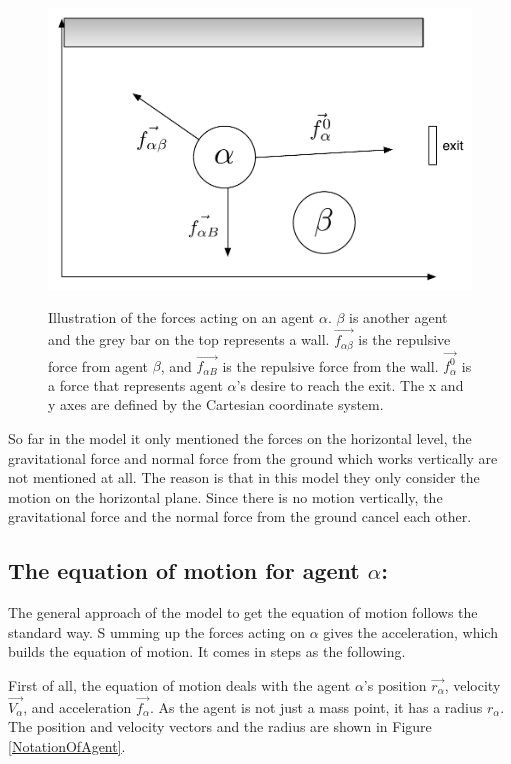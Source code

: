 \begin{figure}[hb]
    \centering
    {\includegraphics[scale=0.45]{Figures/ForceModel.pdf}} 
    \caption[Notation of forces acting on an agent]{Illustration of the forces acting on an agent $\alpha $. $ \beta $ is another agent and the grey bar on the top represents a wall. $ \vec{f_{\alpha\beta}} $ is the repulsive force from agent $ \beta $, and $ \vec{f_{\alpha B}} $ is the repulsive force from the wall. $ \vec{f^{0}_{\alpha}} $ is a force that represents agent $ \alpha $'s desire to reach the exit.
    The x and y axes are defined by the Cartesian coordinate system.}
    \label{ForceModel}
\end{figure}

So far in the model it only mentioned the forces on the horizontal level, the gravitational 
force and normal force from the ground which works vertically are not mentioned at all. The 
reason is that in this model they only consider the motion on the horizontal plane. 
Since there is no motion vertically, the gravitational force and the normal force 
from the ground cancel each other.

\subsection{The equation of motion for agent $ \alpha $:}
The general approach of the model to get the equation of motion follows the standard way. S
umming up the forces acting on $ \alpha $ gives the acceleration, which builds the equation of motion. 
It comes in steps as the following.

First of all, the equation of motion deals with the agent $ \alpha $'s position $\vec{r_{\alpha}}$, velocity 
$\vec{V_{\alpha}}$, and acceleration $ \vec{f_{\alpha}} $. As the agent is not just a mass point, it has a 
radius $r_{\alpha}$. The position and velocity vectors and the radius are shown in Figure \ref{NotationOfAgent}.

